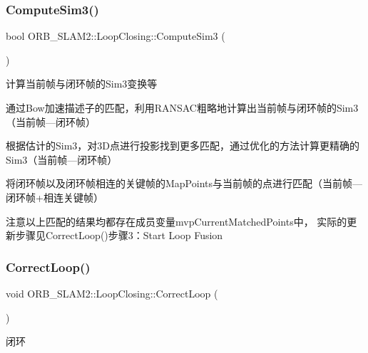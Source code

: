 \subsubsection{\texorpdfstring{Compute\+Sim3()}{ComputeSim3()}}
{\footnotesize\ttfamily bool O\+R\+B\+\_\+\+S\+L\+A\+M2\+::\+Loop\+Closing\+::\+Compute\+Sim3 (\begin{DoxyParamCaption}{ }\end{DoxyParamCaption})\hspace{0.3cm}{\ttfamily [protected]}}



计算当前帧与闭环帧的\+Sim3变换等 


\begin{DoxyEnumerate}
\item 通过\+Bow加速描述子的匹配，利用\+R\+A\+N\+S\+A\+C粗略地计算出当前帧与闭环帧的\+Sim3（当前帧---闭环帧）
\item 根据估计的\+Sim3，对3\+D点进行投影找到更多匹配，通过优化的方法计算更精确的\+Sim3（当前帧---闭环帧）
\item 将闭环帧以及闭环帧相连的关键帧的\+Map\+Points与当前帧的点进行匹配（当前帧---闭环帧+相连关键帧）
\end{DoxyEnumerate}

注意以上匹配的结果均都存在成员变量mvp\+Current\+Matched\+Points中， 实际的更新步骤见\+Correct\+Loop()步骤3：\+Start Loop Fusion \mbox{\label{class_o_r_b___s_l_a_m2_1_1_loop_closing_aa007e0678582ec0de5d71280d23af540}} 
\subsubsection{\texorpdfstring{Correct\+Loop()}{CorrectLoop()}}
{\footnotesize\ttfamily void O\+R\+B\+\_\+\+S\+L\+A\+M2\+::\+Loop\+Closing\+::\+Correct\+Loop (\begin{DoxyParamCaption}{ }\end{DoxyParamCaption})\hspace{0.3cm}{\ttfamily [protected]}}



闭环 


